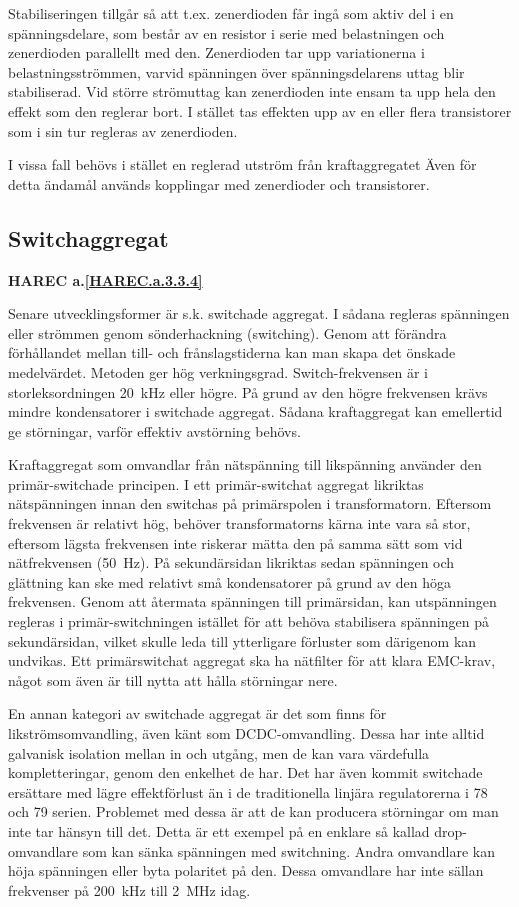 Stabiliseringen tillgår så att t.ex. zenerdioden får ingå som aktiv
del i en spänningsdelare, som består av en resistor i serie med
belastningen och zenerdioden parallellt med den. Zenerdioden tar upp
variationerna i belastningsströmmen, varvid spänningen över
spänningsdelarens uttag blir stabiliserad. Vid större strömuttag kan
zenerdioden inte ensam ta upp hela den effekt som den reglerar bort. I
stället tas effekten upp av en eller flera transistorer som i sin tur
regleras av zenerdioden.

I vissa fall behövs i stället en reglerad utström från kraftaggregatet
Även för detta ändamål används kopplingar med zenerdioder och
transistorer.

\subsection{Switchaggregat}
\textbf{HAREC a.\ref{HAREC.a.3.3.4}\label{myHAREC.a.3.3.4}}

Senare utvecklingsformer är s.k. switchade aggregat. I sådana regleras
spänningen eller strömmen genom sönderhackning (switching). Genom att
förändra förhållandet mellan till- och frånslagstiderna kan man skapa
det önskade medelvärdet. Metoden ger hög verkningsgrad.
Switch-frekvensen är i storleksordningen 20~kHz eller högre.
På grund av den högre frekvensen krävs mindre kondensatorer i
switchade aggregat. Sådana kraftaggregat kan emellertid ge störningar,
varför effektiv avstörning behövs.

Kraftaggregat som omvandlar från nätspänning till likspänning använder
den primär-switchade principen. I ett primär-switchat aggregat likriktas
nätspänningen innan den switchas på primärspolen i transformatorn.
Eftersom frekvensen är relativt hög, behöver transformatorns kärna inte
vara så stor, eftersom lägsta frekvensen inte riskerar mätta den på samma
sätt som vid nätfrekvensen (50~Hz). På sekundärsidan likriktas sedan
spänningen och glättning kan ske med relativt små kondensatorer på grund
av den höga frekvensen. Genom att återmata spänningen till primärsidan, kan
utspänningen regleras i primär-switchningen istället för att behöva
stabilisera spänningen på sekundärsidan, vilket skulle leda till ytterligare
förluster som därigenom kan undvikas. Ett primärswitchat aggregat ska ha
nätfilter för att klara EMC-krav, något som även är till nytta att hålla
störningar nere.

En annan kategori av switchade aggregat är det som finns för
likströmsomvandling, även känt som DCDC-omvandling. Dessa har inte alltid
galvanisk isolation mellan in och utgång, men de kan vara värdefulla
kompletteringar, genom den enkelhet de har. Det har även kommit switchade
ersättare med lägre effektförlust än i de traditionella linjära regulatorerna i
78 och 79 serien.
Problemet med dessa är att de kan producera störningar om man
inte tar hänsyn till det. Detta är ett exempel på en enklare så kallad
drop-omvandlare som kan sänka spänningen med switchning. Andra omvandlare kan
höja spänningen eller byta polaritet på den. Dessa omvandlare har inte sällan
frekvenser på 200~kHz till 2~MHz idag.

